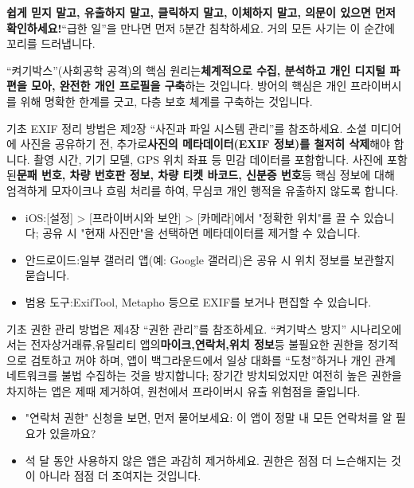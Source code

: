 \textbf{쉽게 믿지 말고, 유출하지 말고, 클릭하지 말고, 이체하지 말고, 의문이 있으면 먼저 확인하세요!}“급한 일”을 만나면 먼저 5분간 침착하세요. 거의 모든 사기는 이 순간에 꼬리를 드러냅니다.


“켜기박스”(사회공학 공격)의 핵심 원리는\textbf{체계적으로 수집, 분석하고 개인 디지털 파편을 모아, 완전한 개인 프로필을 구축}하는 것입니다. 방어의 핵심은 개인 프라이버시를 위해 명확한 한계를 긋고, 다층 보호 체계를 구축하는 것입니다.


기초 EXIF 정리 방법은 제2장 “사진과 파일 시스템 관리”를 참조하세요. 소셜 미디어에 사진을 공유하기 전, 추가로\textbf{사진의 메타데이터(EXIF 정보)를 철저히 삭제}해야 합니다. 촬영 시간, 기기 모델, GPS 위치 좌표 등 민감 데이터를 포함합니다. 사진에 포함된\textbf{문패 번호, 차량 번호판 정보, 차량 티켓 바코드, 신분증 번호}등 핵심 정보에 대해 엄격하게 모자이크나 흐림 처리를 하여, 무심코 개인 행적을 유출하지 않도록 합니다.

\begin{itemize}
  \item iOS:[설정] > [프라이버시와 보안] > [카메라]에서 "정확한 위치"를 끌 수 있습니다; 공유 시 "현재 사진만"을 선택하면 메타데이터를 제거할 수 있습니다.
  \item 안드로이드:일부 갤러리 앱(예: Google 갤러리)은 공유 시 위치 정보를 보관할지 묻습니다.
  \item 범용 도구:ExifTool, Metapho 등으로 EXIF를 보거나 편집할 수 있습니다.
\end{itemize}


기초 권한 관리 방법은 제4장 “권한 관리”를 참조하세요. “켜기박스 방지” 시나리오에서는 전자상거래류,유틸리티 앱의\textbf{마이크,연락처,위치 정보}등 불필요한 권한을 정기적으로 검토하고 꺼야 하며, 앱이 백그라운드에서 일상 대화를 “도청”하거나 개인 관계 네트워크를 불법 수집하는 것을 방지합니다; 장기간 방치되었지만 여전히 높은 권한을 차지하는 앱은 제때 제거하여, 원천에서 프라이버시 유출 위험점을 줄입니다.

\begin{itemize}
  \item "연락처 권한" 신청을 보면, 먼저 물어보세요: 이 앱이 정말 내 모든 연락처를 알 필요가 있을까요?
  \item 석 달 동안 사용하지 않은 앱은 과감히 제거하세요. 권한은 점점 더 느슨해지는 것이 아니라 점점 더 조여지는 것입니다.
\end{itemize}


